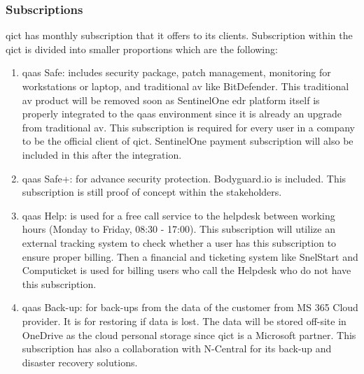 \subsubsection{Subscriptions}

\acrshort{qict} has monthly subscription that it offers to its clients. Subscription within the \acrshort{qict} is divided into smaller
proportions which are the following:
\begin{enumerate}
      \item \acrshort{qaas} Safe: includes security package, patch management, monitoring for workstations or laptop, and traditional
            \acrshort{av} like BitDefender. This traditional \acrshort{av} product will be removed soon as SentinelOne \acrshort{edr} platform
            itself is properly integrated to the \acrshort{qaas} environment since it is already an upgrade from traditional \acrshort{av}. This
            subscription is required for every user in a company to be the official client of \acrshort{qict}. SentinelOne payment subscription
            will also be included in this after the integration.
      \item \acrshort{qaas} Safe+: for advance security protection. Bodyguard.io is included. This subscription is still proof of concept
            within the stakeholders.
      \item \acrshort{qaas} Help: is used for a free call service to the helpdesk between working hours (Monday to Friday, 08:30 - 17:00).
            This subscription will utilize an external tracking system to check whether a user has this subscription to ensure proper billing.
            Then a financial and ticketing system like SnelStart and Computicket is used for billing users who call the Helpdesk who do
            not have this subscription.
      \item \acrshort{qaas} Back-up: for back-ups from the data of the customer from MS 365 Cloud provider. It is for restoring if data is
            lost. The data will be stored off-site in OneDrive as the cloud personal storage since \acrshort{qict} is a Microsoft partner.
            This subscription has also a collaboration with N-Central for its back-up and disaster recovery solutions.
\end{enumerate}



